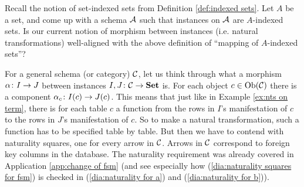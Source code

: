 \begin{exercise}\label{exc:indexed sets as functors}
Recall the notion of set-indexed sets from Definition \ref{def:indexed sets}. Let $A$ be a set, and come up with a schema $\mathcal{A}$ such that instances on $\mathcal{A}$ are $A$-indexed sets. Is our current notion of morphism between instances (i.e. natural transformations) well-aligned with the above definition of “mapping of $A$-indexed sets”?
\end{exercise}

For a general schema (or category) $\mathcal{C}$, let us think through what a morphism $\alpha\colon I\rightarrow J$ between instances $I,J\colon\mathcal{C}\rightarrow{\bf Set}$ is. For each object $c\in\textnormal{Ob}(\mathcal{C})$ there is a component $\alpha_c\colon I(c)\rightarrow J(c)$. This means that just like in Example \ref{ex:nts on term}, there is for each table $c$ a function from the rows in $I$'s manifestation of $c$ to the rows in $J$'s manifestation of $c$. So to make a natural transformation, such a function has to be specified table by table. But then we have to contend with naturality squares, one for every arrow in $\mathcal{C}$. Arrows in $\mathcal{C}$ correspond to foreign key columns in the database. The naturality requirement was already covered in Application \ref{app:change of fsm} (and see especially how (\ref{dia:naturality squares for fsm}) is checked in (\ref{dia:naturality for a}) and (\ref{dia:naturality for b})).


